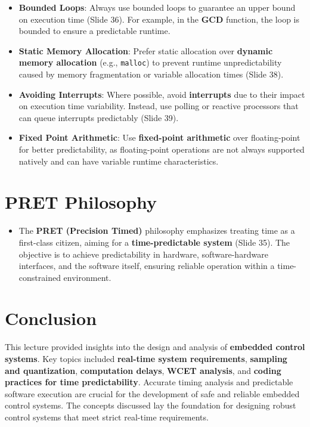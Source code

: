 \documentclass[
  14pt,
  a4paper,
  numbers=noendperiod,
  headinclude=true,
  footinclude=true,
  DIV=calc]{scrreprt}
\providecommand{\tightlist}{%
  \setlength{\itemsep}{0pt}\setlength{\parskip}{0pt}}\usepackage{longtable,booktabs,array}
\begin{document}
\begin{itemize}
\item
  \textbf{Bounded Loops}: Always use bounded loops to guarantee an upper
  bound on execution time (Slide 36). For example, in the \textbf{GCD}
  function, the loop is bounded to ensure a predictable runtime.
\item
  \textbf{Static Memory Allocation}: Prefer static allocation over
  \textbf{dynamic memory allocation} (e.g., \texttt{malloc}) to prevent
  runtime unpredictability caused by memory fragmentation or variable
  allocation times (Slide 38).
\item
  \textbf{Avoiding Interrupts}: Where possible, avoid
  \textbf{interrupts} due to their impact on execution time variability.
  Instead, use polling or reactive processors that can queue interrupts
  predictably (Slide 39).
\item
  \textbf{Fixed Point Arithmetic}: Use \textbf{fixed-point arithmetic}
  over floating-point for better predictability, as floating-point
  operations are not always supported natively and can have variable
  runtime characteristics.
\end{itemize}

\section{PRET Philosophy}\label{pret-philosophy}

\begin{itemize}
\tightlist
\item
  The \textbf{PRET (Precision Timed)} philosophy emphasizes treating
  time as a first-class citizen, aiming for a \textbf{time-predictable
  system} (Slide 35). The objective is to achieve predictability in
  hardware, software-hardware interfaces, and the software itself,
  ensuring reliable operation within a time-constrained environment.
\end{itemize}

\section{Conclusion}\label{conclusion-5}

This lecture provided insights into the design and analysis of
\textbf{embedded control systems}. Key topics included \textbf{real-time
system requirements}, \textbf{sampling and quantization},
\textbf{computation delays}, \textbf{WCET analysis}, and \textbf{coding
practices for time predictability}. Accurate timing analysis and
predictable software execution are crucial for the development of safe
and reliable embedded control systems. The concepts discussed lay the
foundation for designing robust control systems that meet strict
real-time requirements.
\end{document}
